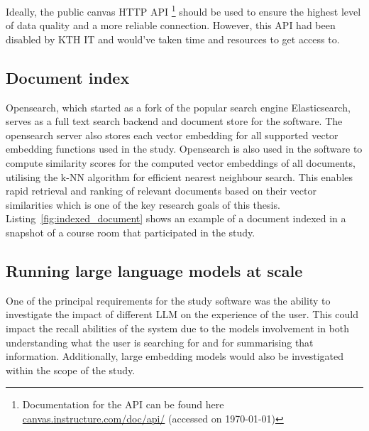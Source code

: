 Ideally, the public canvas HTTP API \footnote{Documentation for the API can be found here \href{https://canvas.instructure.com/doc/api/}{canvas.instructure.com/doc/api/} (accessed on \today)} should be used to ensure the highest level of data quality and a more reliable connection. However, this API had been disabled by KTH IT and would’ve taken time and resources to get access to.






% 


\subsection{Document index}


Opensearch, which started as a fork of the popular search engine Elasticsearch, serves as a full text search backend and document store for the software. The opensearch server also stores each vector embedding for all supported vector embedding functions used in the study. Opensearch is also used in the software to compute similarity scores for the computed vector embeddings of all documents, utilising the k-NN algorithm for efficient nearest neighbour search. This enables rapid retrieval and ranking of relevant documents based on their vector similarities which is one of the key research goals of this thesis. Listing~\ref{fig:indexed_document} shows an example of a document indexed in a snapshot of a course room that participated in the study.





\subsection{Running large language models at scale}


One of the principal requirements for the study software was the ability to investigate the impact of different \gls{LLM} on the experience of the user. This could impact the recall abilities of the system due to the models involvement in both understanding what the user is searching for and for summarising that information. Additionally, large embedding models would also be investigated within the scope of the study.


